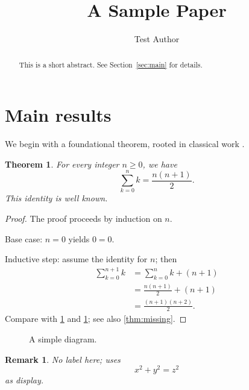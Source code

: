 \documentclass{amsart}
\theoremstyle{plain}
\newtheorem{theorem}{Theorem}[section]
\newtheorem*{remark}{Remark}
\begin{document}
\title{A Sample Paper}
\author{Test Author}
\maketitle

\begin{abstract}
This is a short abstract. See Section~\ref{sec:main} for details.
\end{abstract}

\section{Main results}
\label{sec:main}

We begin with a foundational theorem, rooted in classical work \cite{GKP1994,Stanley2011}.

\begin{theorem}
\label{thm:main}
For every integer $n \geq 0$, we have
\[
  \sum_{k=0}^{n} k = \frac{n(n+1)}{2}.
\]
This identity is well known.
\end{theorem}

\begin{proof}
The proof proceeds by induction on $n$.

Base case: $n=0$ yields $0=0$.

Inductive step: assume the identity for $n$; then
\begin{align}
  \sum_{k=0}^{n+1} k
    &= \sum_{k=0}^{n} k + (n+1) \\
    &= \frac{n(n+1)}{2} + (n+1) \\
    &= \frac{(n+1)(n+2)}{2}.
\end{align}
Compare with \cref{thm:main} and \ref{fig:diagram}; see also \ref{thm:missing}.
\end{proof}

\begin{figure}
\label{fig:diagram}
\caption{A simple diagram.}
\end{figure}


\begin{remark}
No label here; uses $$x^2 + y^2 = z^2$$ as display.
\end{remark}
\end{document}
